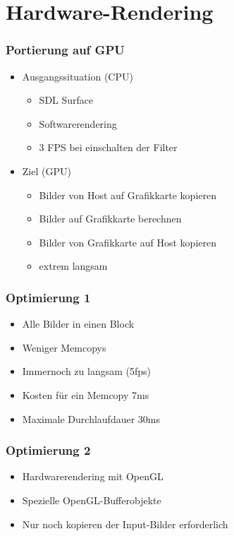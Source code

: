 \documentclass[compress]{beamer}
\begin{document}
\section{Hardware-Rendering}

\begin{frame}
\frametitle{Portierung auf GPU}
\begin{itemize}
\item Ausgangssituation (CPU)
	\begin{itemize}
		\item SDL Surface
		\item Softwarerendering
		\item 3 FPS bei einschalten der Filter
	\end{itemize}
\item Ziel (GPU)
	\begin{itemize}
		\item Bilder von Host auf Grafikkarte kopieren
		\item Bilder auf Grafikkarte berechnen
		\item Bilder von Grafikkarte auf Host kopieren
		\item extrem langsam 
	\end{itemize}
\end{itemize}
\end{frame}

\begin{frame}
\frametitle{Optimierung 1}
\begin{itemize}
\item Alle Bilder in einen Block
\item Weniger Memcopys
\item Immernoch zu langsam (5fps)
\item Kosten für ein Memcopy 7ms
\item Maximale Durchlaufdauer 30ms
\end{itemize}
\end{frame}

\begin{frame}
\frametitle{Optimierung 2}
\begin{itemize}
\item Hardwarerendering mit OpenGL
\item Spezielle OpenGL-Bufferobjekte
\item Nur noch kopieren der Input-Bilder erforderlich
\end{itemize}
\end{frame}
\end{document}

